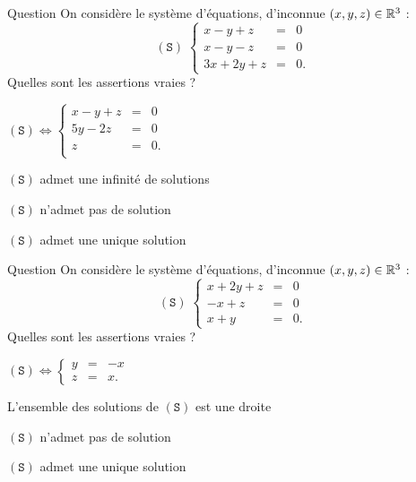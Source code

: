 

\begin{multi}[multiple,feedback=
{L'algorithme de Gauss donne :
\[ (\mathtt{S})  \Leftrightarrow  \left\{\begin{array}{rcc}
x-y+z&=&0\\
5y-2z&=&0\\ 
z&=&0.\end{array}\right.\]
Donc \((\mathtt{S})\) admet une unique solution : \((0,0,0)\).
}]{Question}
On considère le système d'équations, d'inconnue \((x,y,z)\in \mathbb{R}^3\) : 
\[(\mathtt{S})\; \left\{\begin{array}{rcc}x-y+z&=&0\\
x-y-z&=&0\\ 3x+2y+z&=&0. \end{array}\right.\]
Quelles sont les assertions vraies ?

    \item* \((\mathtt{S}) \Leftrightarrow  \left\{\begin{array}{rcc}
x-y+z&=&0\\
5y-2z&=&0\\
z&=&0.\\
\end{array}\right.\)
    \item \((\mathtt{S})\) admet une infinité de solutions
    \item \((\mathtt{S})\) n'admet pas de solution
    \item* \((\mathtt{S})\) admet une unique solution
\end{multi}


\begin{multi}[multiple,feedback=
{\[(\mathtt{S}) \Leftrightarrow  \left\{\begin{array}{rcc}
y&=&-x\\
z&=&x.\end{array}\right.\]
L'ensemble des solutions de \((\mathtt{S})\) est la droite : \(\{(x,-x,x)\, ; \; x \in \Rr\}\).
}]{Question}
On considère le système d'équations, d'inconnue \((x,y,z)\in \mathbb{R}^3\) :  
\[(\mathtt{S}) \; \left\{\begin{array}{rcc}
x+2y+z&=&0\\
-x+z&=&0\\
x+y&=&0.\end{array}\right.\]
Quelles sont les assertions vraies ?

    \item* \((\mathtt{S}) \Leftrightarrow  \left\{\begin{array}{rcc}
y&=&-x\\
z&=&x.\end{array}\right.\)
    \item* L'ensemble des solutions de \((\mathtt{S})\) est une droite
    \item \((\mathtt{S})\) n'admet pas de solution
    \item \((\mathtt{S})\) admet une unique solution
\end{multi}


